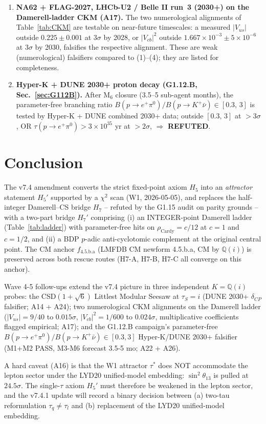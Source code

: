 \documentclass[a4paper,11pt]{article}
\newcommand{\fLM}{f_{\text{4.5.b.a}}}
\newcommand{\Qi}{\mathbb{Q}(i)}
\theoremstyle{definition}
\theoremstyle{remark}
\begin{document}
\begin{enumerate}
    near $0$ or $+90^{\circ}$.  JUNO 2030 NMO at $3$--$4\sigma$
    independently kills the NO + $m_1=0$ prediction if inverted.
  \item \textbf{NA62 + FLAG-2027, LHCb-U2 / Belle II run~3 (2030+)
    on the Damerell-ladder CKM (A17).}  The two numerological
    alignments of Table~\ref{tab:CKM} are testable on near-future
    timescales: a measured $|V_{us}|$ outside $0.225\pm 0.001$ at
    $3\sigma$ by 2028, or $|V_{cb}|^2$ outside $1.667\times 10^{-3}\pm
    5\times 10^{-6}$ at $3\sigma$ by 2030, falsifies the respective
    alignment.  These are weak (numerological) falsifiers compared
    to (1)--(4); they are listed for completeness.
  \item \textbf{Hyper-K + DUNE 2030+ proton decay (G1.12.B,
    Sec.~\ref{sec:G112B}).}  After M$_6$ closure (3.5--5 sub-agent
    months), the parameter-free branching ratio
    $B(p\to e^+\pi^0)/B(p\to K^+\bar\nu)\in[0.3,\,3]$ is tested by
    Hyper-K + DUNE combined 2030+ data; outside $[0.3,\,3]$ at
    $>3\sigma$, OR $\tau(p\to e^+\pi^0)>3\times 10^{35}$ yr at
    $>2\sigma$, $\Rightarrow$ \textbf{REFUTED}.
\end{enumerate}

\section{Conclusion}
\label{sec:conclusion}

The v7.4 amendment converts the strict fixed-point axiom $H_5$ into an
\emph{attractor} statement $H_5'$ supported by a $\chi^{2}$ scan
(W1, 2026-05-05), and replaces the half-integer Damerell--CS bridge
$H_7$ -- refuted by the G1.15 audit on parity grounds -- with a
two-part bridge $H_7'$ comprising (i) an INTEGER-point Damerell
ladder (Table~\ref{tab:ladder}) with parameter-free hits on
$\rho_{\mathrm{Cardy}}=c/12$ at $c=1$ and $c=1/2$, and (ii) a BDP
$p$-adic anti-cyclotomic complement at the original central point.
The CM anchor $\fLM$ (LMFDB CM newform 4.5.b.a, CM by $\Qi$) is
preserved across both rescue routes (H7-A, H7-B, H7-C all converge on
this anchor).
\par
Wave 4-5 follow-ups extend the v7.4 picture in three independent
$K=\Qi$ probes: the CSD$(1+\sqrt 6)$ Littlest Modular Seesaw at
$\tau_S=i$ (DUNE 2030+ $\delta_{CP}$ falsifier; A14 + A24);
two numerological CKM alignments on the Damerell ladder
($|V_{us}|=9/40$ to $0.015\sigma$, $|V_{cb}|^2=1/600$ to
$0.024\sigma$, multiplicative coefficients flagged empirical;
A17); and the G1.12.B campaign's parameter-free
$B(p\to e^+\pi^0)/B(p\to K^+\bar\nu)\in[0.3,3]$ Hyper-K/DUNE 2030+
falsifier (M1+M2 PASS, M3-M6 forecast 3.5-5 mo; A22 + A26).
\par
A hard caveat (A16) is that the W1 attractor $\tau^{*}$ does NOT
accommodate the lepton sector under the LYD20 unified-model embedding:
$\sin^2\theta_{13}$ is pulled at $24.5\sigma$.  The single-$\tau$
axiom $H_5'$ must therefore be weakened in the lepton sector,
and the v7.4.1 update will record a binary decision between (a)
two-tau reformulation $\tau_q\ne\tau_l$ and (b) replacement of the
LYD20 unified-model embedding.
\end{document}
